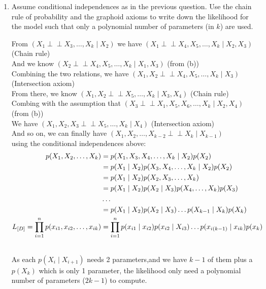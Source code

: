 \documentclass[11pt]{article}
\begin{document}
\begin{enumerate}
\item Assume conditional independences as in the previous question.  Use the chain rule of probability and the graphoid axioms to write down the likelihood for the model such that only a polynomial number of parameters (in $k$) are used.\\
\begin{answertext}{13cm}{}

From $(X_{1} {\perp\!\!\!\perp} X_{3}, \ldots, X_{k} \mid X_{2})$ we have $(X_{1} {\perp\!\!\!\perp} X_{4}, X_{5}, \ldots, X_{k} \mid X_{2}, X_{3})$ (Chain rule)\\
And we know $(X_{2} {\perp\!\!\!\perp} X_{4}, X_{5}, \ldots, X_{k} \mid X_{1}, X_{3})$ (from (b))\\
Combining the two relations, we have $(X_{1}, X_{2} {\perp\!\!\!\perp} X_{4}, X_{5}, \ldots, X_{k} \mid X_{3})$ (Intersection axiom)\\
From there, we know $(X_{1}, X_{2} {\perp\!\!\!\perp} X_{5}, \ldots, X_{k} \mid X_{3}, X_{4})$ (Chain rule)\\
Combing with the assumption that $(X_{3} {\perp\!\!\!\perp} X_{1}, X_{5}, X_6, \ldots, X_{k} \mid X_{2}, X_{4})$ (from (b))\\
We have $(X_{1}, X_{2}, X_{3} {\perp\!\!\!\perp} X_{5}, \ldots, X_{k} \mid X_{4})$ (Intersection axiom)\\
And so on, we can finally have $(X_{1}, X_{2}, \ldots, X_{k-2} {\perp\!\!\!\perp} X_{k} \mid X_{k-1})$ \\
using the conditional independences above:
\\
\begin{align}
p(X_{1}, X_{2}, \ldots, X_{k}) &= p(X_{1}, X_{3}, X_{4}, \dots, X_{k} \mid X_{2}) p(X_{2})\notag\\
&= p(X_{1} \mid X_{2}) p(X_{3}, X_{4}, \ldots, X_{k} \mid X_{2}) p(X_{2}) \notag\\
&= p(X_{1} \mid X_{2}) p(X_{2}, X_{3}, \ldots, X_{k}) \notag\\
&= p(X_{1} \mid X_{2}) p(X_{2} \mid X_{3}) p(X_{4}, \ldots, X_{k}) p(X_3) \notag\\
&\ldots \notag\\
&= p(X_{1} \mid X_{2}) p(X_{2} \mid X_{3}) \ldots p(X_{k-1} \mid X_{k}) p(X_{k}) \notag\\
L_{[D]} = \prod_{i=1}^{n} p(x_{i1}, x_{i2}, \ldots, x_{ik}) &= \prod_{i=1}^{n} p(x_{i1} \mid x_{i2}) p(x_{i2} \mid X_{i3}) \ldots p(x_{i(k-1)} \mid x_{ik}) p(x_{k}) \notag\\
\notag
\end{align}
As each $p(X_{i} \mid X_{i+1})$ needs 2 parameters,and we have $k-1$ of them plus a $p(X_{k})$ which is only 1 parameter, the likelihood only need a polynomial number of parameters ($2k-1$) to compute. \\

\end{answertext} 
\end{enumerate}
\end{document}
